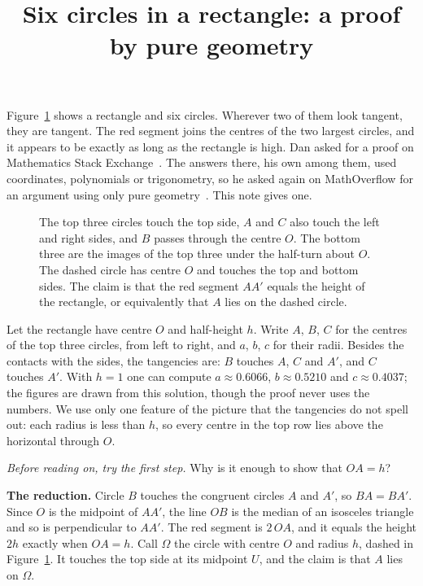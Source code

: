 \documentclass[11pt]{article}
\title{Six circles in a rectangle: a proof by pure geometry}
\author{}
\date{}
\begin{document}
\maketitle
\vspace{-3em}

Figure~\ref{fig:config} shows a rectangle and six circles. Wherever two of them look tangent, they are tangent. The red segment joins the centres of the two largest circles, and it appears to be exactly as long as the rectangle is high. Dan asked for a proof on Mathematics Stack Exchange~\cite{MSE}. The answers there, his own among them, used coordinates, polynomials or trigonometry, so he asked again on MathOverflow for an argument using only pure geometry~\cite{MO}. This note gives one.

\begin{figure}[ht]
\centering

\caption{The top three circles touch the top side, $A$ and $C$ also touch the left and right sides, and $B$ passes through the centre $O$. The bottom three are the images of the top three under the half-turn about $O$. The dashed circle has centre $O$ and touches the top and bottom sides. The claim is that the red segment $AA'$ equals the height of the rectangle, or equivalently that $A$ lies on the dashed circle.}
\label{fig:config}
\end{figure}

Let the rectangle have centre $O$ and half-height $h$. Write $A$, $B$, $C$ for the centres of the top three circles, from left to right, and $a$, $b$, $c$ for their radii. Besides the contacts with the sides, the tangencies are: $B$ touches $A$, $C$ and $A'$, and $C$ touches $A'$. With $h=1$ one can compute $a\approx0.6066$, $b\approx0.5210$ and $c\approx0.4037$; the figures are drawn from this solution, though the proof never uses the numbers. We use only one feature of the picture that the tangencies do not spell out: each radius is less than $h$, so every centre in the top row lies above the horizontal through $O$.

\emph{Before reading on, try the first step.} Why is it enough to show that $OA=h$?

\textbf{The reduction.} Circle $B$ touches the congruent circles $A$ and $A'$, so $BA=BA'$. Since $O$ is the midpoint of $AA'$, the line $OB$ is the median of an isosceles triangle and so is perpendicular to $AA'$. The red segment is $2\,OA$, and it equals the height $2h$ exactly when $OA=h$. Call $\Omega$ the circle with centre $O$ and radius $h$, dashed in Figure~\ref{fig:config}. It touches the top side at its midpoint $U$, and the claim is that $A$ lies on $\Omega$.
\end{document}
